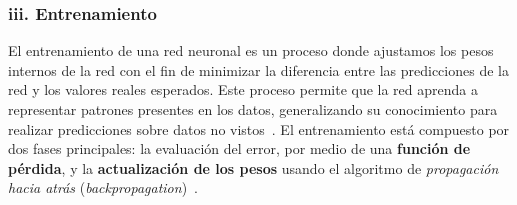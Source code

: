 \documentclass[11pt]{article} %
\begin{document}
\subsubsection{iii. Entrenamiento}
\vspace{3pt}
El entrenamiento de una red neuronal es un proceso donde ajustamos los pesos internos de la red con el fin de minimizar la diferencia entre las predicciones de la red y los valores reales esperados. Este proceso permite que la red aprenda a representar patrones presentes en los datos, generalizando su conocimiento para realizar predicciones sobre datos no vistos~\cite{zhou2020graph}. El entrenamiento está compuesto por dos fases principales: la evaluación del error, por medio de una \textbf{función de pérdida}, y la \textbf{actualización de los pesos} usando el algoritmo de \textit{propagación hacia atrás} (\textit{backpropagation})~\cite{nvidia}.
\end{document}
